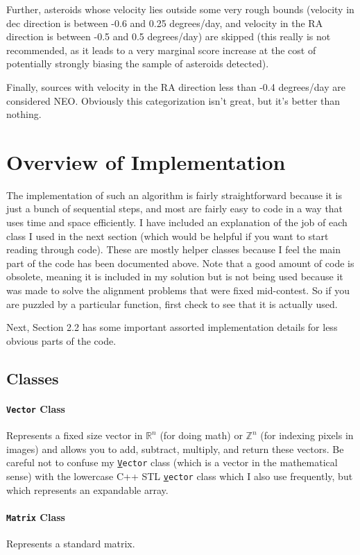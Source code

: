 \documentclass[letterpaper,options]{article}
\begin{document}
Further, asteroids whose velocity lies outside some very rough bounds (velocity in dec direction is between -0.6 and 0.25 degrees/day, and velocity in the RA direction is between -0.5 and 0.5 degrees/day) are skipped (this really is not recommended, as it leads to a very marginal score increase at the cost of potentially strongly biasing the sample of asteroids detected).

Finally, sources with velocity in the RA direction less than -0.4 degrees/day are considered NEO. Obviously this categorization isn't great, but it's better than nothing.

\section{Overview of Implementation}
The implementation of such an algorithm is fairly straightforward because it is just a bunch of sequential steps, and most are fairly easy to code in a way that uses time and space efficiently. I have included an explanation of the job of each class I used in the next section (which would be helpful if you want to start reading through code). These are mostly helper classes because I feel the main part of the code has been documented above. Note that a good amount of code is obsolete, meaning it is included in my solution but is not being used because it was made to solve the alignment problems that were fixed mid-contest. So if you are puzzled by a particular function, first check to see that it is actually used.

Next, Section 2.2 has some important assorted implementation details for less obvious parts of the code.
\subsection{Classes}
\paragraph{\texttt{Vector} Class}
Represents a fixed size vector in $\mathbb{R}^n$ (for doing math) or $\mathbb{Z}^n$ (for indexing pixels in images) and allows you to add, subtract, multiply, and return these vectors. Be careful not to confuse my \texttt{\underline{V}ector} class (which is a vector in the mathematical sense) with the lowercase C++ STL \texttt{\underline{v}ector} class which I also use frequently, but which represents an expandable array.
\paragraph{\texttt{Matrix} Class}
Represents a standard matrix.
\end{document}
